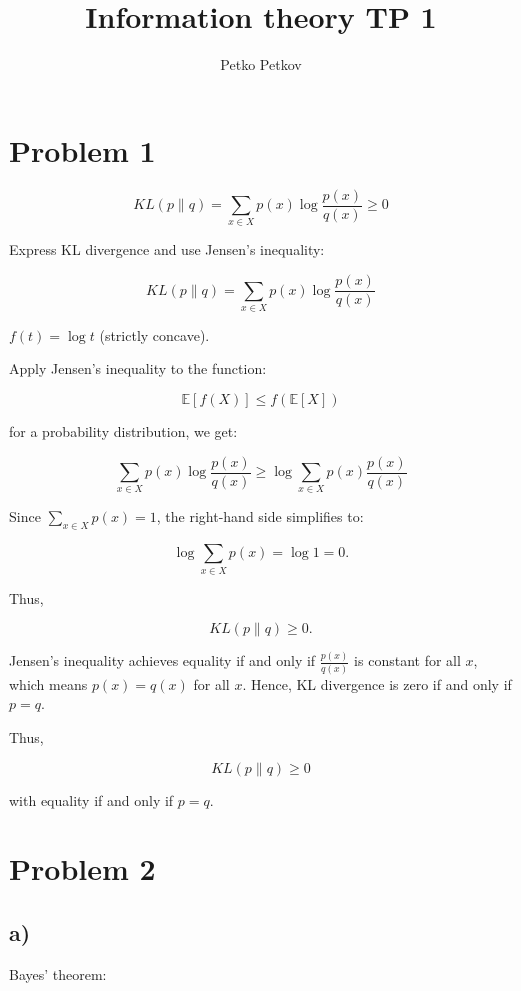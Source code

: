 \documentclass{article}
\title{Information theory TP 1}
\author{Petko Petkov}
\begin{document}
\date{}
\maketitle

\section*{Problem 1}

\[
KL(p \| q) = \sum_{x \in X} p(x) \log \frac{p(x)}{q(x)} \geq 0
\]

Express KL divergence and use Jensen's inequality:

\[
KL(p \| q) = \sum_{x \in X} p(x) \log \frac{p(x)}{q(x)}
\]

\( f(t) = \log t \) (strictly concave).

\vspace{5mm}

Apply Jensen’s inequality to the function:

\[
\mathbb{E}[f(X)] \leq f(\mathbb{E}[X])
\]

for a probability distribution, we get:

\[
\sum_{x \in X} p(x) \log \frac{p(x)}{q(x)} \geq \log \sum_{x \in X} p(x) \frac{p(x)}{q(x)}
\]

Since \( \sum_{x \in X} p(x) = 1 \), the right-hand side simplifies to:

\[
\log \sum_{x \in X} p(x) = \log 1 = 0.
\]

\vspace{5mm}

Thus,

\[
KL(p \| q) \geq 0.
\]

Jensen’s inequality achieves equality if and only if \( \frac{p(x)}{q(x)} \) is constant for all \( x \), which means \( p(x) = q(x) \) for all \( x \). Hence, KL divergence is zero if and only if \( p = q \).

\vspace{5mm}
Thus,

\[
KL(p \| q) \geq 0
\]

with equality if and only if \( p = q \).

\section*{Problem 2}

\subsection*{a)} Bayes’ theorem:
\end{document}
